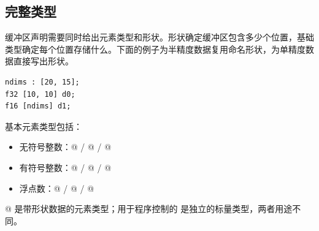 \subsection*{完整类型}

缓冲区声明需要同时给出元素类型和形状。形状确定缓冲区包含多少个位置，基础类型确定每个位置存储什么。下面的例子为半精度数据复用命名形状，为单精度数据直接写出形状。

\begin{lstlisting}[language=croqtile,caption={完整类型}]
ndims : [20, 15];
f32 [10, 10] d0;
f16 [ndims] d1;
\end{lstlisting}

基本元素类型包括：

\begin{itemize}[leftmargin=1.6em]
\item 无符号整数：@ / @ / @
\item 有符号整数：@ / @ / @
\item 浮点数：@ / @ / @
\end{itemize}

@ 是带形状数据的元素类型；用于程序控制的 \co@int@ 是独立的标量类型，两者用途不同。
